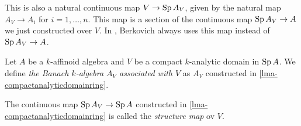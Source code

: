     \begin{remark}
        This is also a natural continuous map $V\rightarrow \operatorname{Sp} A_V$, given by the natural map $A_V\rightarrow A_i$ for $i=1,\ldots,n$. This map is a section of the continuous map $\operatorname{Sp} A_V\rightarrow A$ we just constructed over $V$. In \cite{Berk93}, Berkovich always uses this map instead of  $\operatorname{Sp} A_V\rightarrow A$. 
    \end{remark}
    
    
    \begin{definition}
        Let $A$ be a $k$-affinoid algebra and $V$ be a compact $k$-analytic domain in $\operatorname{Sp} A$. We define \emph{the Banach $k$-algebra $A_V$ associated with $V$} as $A_V$ constructed in \cref{lma-compactanalyticdomainring}.
    
        The continuous map $\operatorname{Sp} A_V\rightarrow \operatorname{Sp} A$ constructed in  \cref{lma-compactanalyticdomainring} is called the \emph{structure map} ov $V$.
    \end{definition}
    
